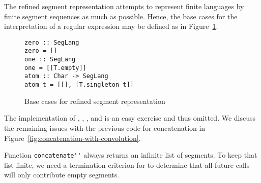 The refined segment representation attempts to represent finite
languages by finite segment sequences as much as possible. Hence, the
base cases for the interpretation of a regular expression may be
defined as in Figure~\ref{fig:base-cases-segmented}.
\begin{figure}[tp]
\begin{lstlisting}
zero :: SegLang
zero = []
one :: SegLang
one = [[T.empty]]
atom :: Char -> SegLang
atom t = [[], [T.singleton t]]
\end{lstlisting}
  \caption{Base cases for refined segment representation}
  \label{fig:base-cases-segmented}
\end{figure}
The implementation of , , 
, and  is an easy exercise and thus omitted.
We discuss the remaining issues with the previous code for concatenation in
Figure~\ref{fig:concatenation-with-convolution}. 

Function \lstinline{concatenate''} always returns an infinite list of
segments. To keep that list finite, we need
a termination criterion for  to determine that all
future calls will only contribute empty segments.

